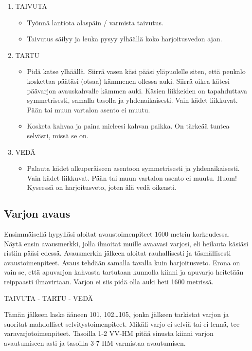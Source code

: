 \begin{enumerate}[label=\bfseries \arabic*)]
\item  TAIVUTA 
	\begin{itemize}
	\item  Työnnä lantiota alaspäin / varmista taivutus. 
	\item  Taivutus säilyy ja leuka pysyy ylhäällä koko harjoitusvedon ajan. 
	\end{itemize}
\item  TARTU 
	\begin{itemize}
	\item  Pidä katse ylhäällä. Siirrä vasen käsi pääsi yläpuolelle siten, että peukalo koskettaa päätäsi (otsaa) kämmenen ollessa auki. Siirrä oikea kätesi päävarjon avauskahvalle kämmen auki. Käsien liikkeiden on tapahduttava symmetrisesti, samalla tasolla ja yhdenaikaisesti. Vain kädet liikkuvat. Pään tai muun vartalon asento ei muutu.  
	\item  Kosketa kahvaa ja paina mieleesi kahvan paikka. On tärkeää tuntea selvästi, missä se on.   
	\end{itemize}
\item  VEDÄ 
	\begin{itemize}
	\item  Palauta kädet alkuperäiseen asentoon symmetrisesti ja yhdenaikaisesti. Vain kädet liikkuvat. Pään tai muun vartalon asento ei muutu. Huom! Kyseessä on harjoitusveto, joten älä vedä oikeasti. 
	\end{itemize}
\end{enumerate}
\subsection{ Varjon avaus }
\label{nova-alkeiskoulutuksen-suoritukset-varjon-avaus}


Ensimmäisellä hypylläsi aloitat avaustoimenpiteet 1600 metrin korkeudessa. Näytä ensin avausmerkki, jolla ilmoitat muille avaavasi varjosi, eli heilauta käsiäsi ristiin pääsi edessä. Avausmerkin jälkeen aloitat rauhallisesti ja täsmällisesti avaustoimenpiteet. Avaus tehdään samalla tavalla kuin harjoitusveto. Erona on vain se, että apuvarjon kahvasta tartutaan kunnolla kiinni ja apuvarjo heitetään reippaasti ilmavirtaan. Varjon ei siis pidä olla auki heti 1600 metrissä.  


TAIVUTA - TARTU - VEDÄ 


Tämän jälkeen laske ääneen 101, 102…105, jonka jälkeen tarkistat varjon ja suoritat mahdolliset selvitystoimenpiteet. Mikäli varjo ei selviä tai ei lennä, tee varavarjotoimenpiteet. Tasoilla 1-2 VV-HM pitää sinusta kiinni varjon avautumiseen asti ja tasoilla 3-7 HM varmistaa avautumisen.  

